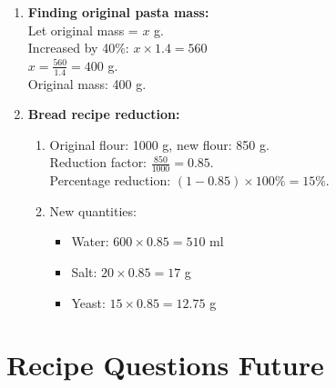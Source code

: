 \documentclass[12pt]{article}
\begin{document}
\begin{enumerate}
    \item \textbf{Finding original pasta mass:} \\
    Let original mass = \( x \) g. \\
    Increased by 40\%: \( x \times 1.4 = 560 \) \\
    \( x = \frac{560}{1.4} = 400 \) g. \\
    Original mass: 400 g.

    \item \textbf{Bread recipe reduction:}
    \begin{enumerate}
        \item Original flour: 1000 g, new flour: 850 g. \\
        Reduction factor: \( \frac{850}{1000} = 0.85 \). \\
        Percentage reduction: \( (1 - 0.85) \times 100\% = 15\% \).
        \item New quantities:
        \begin{itemize}
            \item Water: \( 600 \times 0.85 = 510\) ml
            \item Salt: \( 20 \times 0.85 = 17\) g
            \item Yeast: \( 15 \times 0.85 = 12.75\) g
        \end{itemize}
    \end{enumerate}
\end{enumerate}

\section*{Recipe Questions Future}
\end{document}
